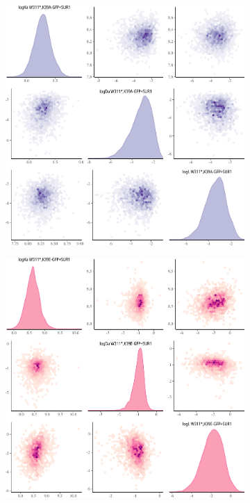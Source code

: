 \begin{figure}[h]
\begin{subfigure}[t]{0.3\textwidth}
	\end{subfigure}
	\hfill
	\begin{subfigure}[t]{0.3\textwidth}
		\caption{}\label{apxfig:inhib_cc_5}
		\centering
		\includegraphics[width=\textwidth]{inhibition_crosscorr_5.pdf}
	\end{subfigure}
	\hfill
	\begin{subfigure}[t]{0.3\textwidth}
		\caption{}\label{apxfig:inhib_cc_6}
		\centering
		\includegraphics[width=\textwidth]{inhibition_crosscorr_6.pdf}

\end{subfigure}
\end{figure}
